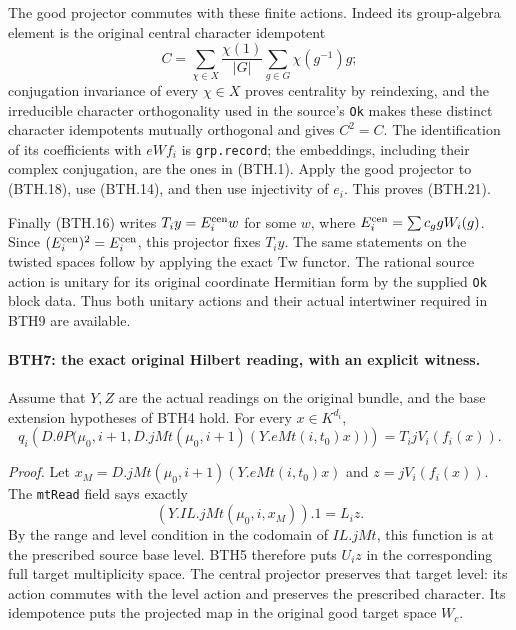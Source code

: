 The good projector commutes with these finite actions.
Indeed its group-algebra element is the original central
character idempotent
\[
C=\sum_{\chi\in X}\frac{\chi(1)}{|G|}
                 \sum_{g\in G}\chi(g^{-1})g ;
 \tag{BTH.23}
\]
conjugation invariance of every \(\chi\in X\) proves centrality by
reindexing, and the irreducible character orthogonality
used in the source's \texttt{Ok} makes these distinct character
idempotents mutually orthogonal and gives \(C^2=C\).
The identification of its coefficients with \(eWf_i\)
is \texttt{grp.record}; the embeddings, including their
complex conjugation, are the ones in (BTH.1).
Apply the good projector to (BTH.18), use (BTH.14), and
then use injectivity of \(e_i\).  This proves (BTH.21).

Finally (BTH.16) writes \(T_i y=E_i^{\rm cen}w\) for
some \(w\), where \(E_i^{\rm cen}=\sum c_g gW_i(g)\).
Since \((E_i^{\rm cen})^2=E_i^{\rm cen}\), this projector
fixes \(T_i y\).  The same statements on the twisted
spaces follow by applying the exact \(\mathrm{Tw}\) functor.
The rational source action is unitary for its original
coordinate Hermitian form by the supplied \texttt{Ok}
block data.  Thus both unitary actions and their actual
intertwiner required in BTH9 are available.

\paragraph{BTH7: the exact original Hilbert reading, with an explicit witness.}
\label{claim:BTH7}
Assume that \(Y,Z\) are the actual readings on the original
bundle, and the base extension hypotheses of BTH4 hold.
For every \(x\in K^{d_i}\),
\[
 q_i\!\left(
 D.\theta P\bigl(\mu_0,i+1,D.jMt(\mu_0,i+1)(Y.eMt(i,t_0)x)\bigr)
       \right)=T_i jV_i(f_i(x)).                               \tag{BTH.24}
\]

\emph{Proof.}
Let \(x_M=D.jMt(\mu_0,i+1)(Y.eMt(i,t_0)x)\) and
\(z=jV_i(f_i(x))\).  The \texttt{mt\allowbreak Read} field says exactly
\[
       (Y.IL.jMt(\mu_0,i,x_M)).1=L_i z.                         \tag{BTH.25}
\]
By the range and level condition in the codomain of
\(IL.jMt\), this function is at the prescribed source
base level.  BTH5 therefore puts \(U_i z\) in the
corresponding full target multiplicity space.
The central projector preserves that target level:
its action commutes with the level action and preserves
the prescribed character.  Its idempotence puts the
projected map in the original good target space \(W_c\).

